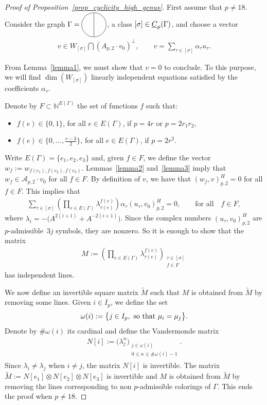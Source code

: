 \documentclass[pdftex]{sigma}
\numberwithin{equation}{section}
\begin{document}
\begin{proof}[Proof of Proposition~\ref{prop_cyclicity_high_genus}]First assume that $p\neq 18$. Consider the graph $\Gamma=\Thetagraph$, a class $[\sigma]\in \underline{C}_p(\Gamma)$, and choose a vector
\begin{gather*}
 v \in W_{[\sigma]}\bigcap \left( A_{p,2}\cdot v_0\right)^{\bot},\qquad v = \sum_{\tau\in [\sigma]}{\alpha_{\tau}u_{\tau}}.
\end{gather*}

From Lemma~\ref{lemma1}, we must show that $v=0$ to conclude. To this purpose, we will find $\dim \left(W_{[\sigma]}\right)$ linearly independent equations satisfied by the coefficients $\alpha_{\tau}$.

Denote by $F\subset \mathbb{N}^{E(\Gamma)}$ the set of functions $f$ such that:
\begin{itemize}\itemsep=0pt
\item $f(e) \in \{0,1\}$, for all $e\in E(\Gamma)$, if $p=4r$ or $p=2r_1r_2$,
\item $f(e) \in \big\{ 0, \ldots, \frac{r-3}{2} \big\}$, for all $e \in E(\Gamma)$, if $p=2r^2$.
\end{itemize}
Write $E(\Gamma)=\{e_1, e_2, e_3\}$ and, given $f\in F$, we define the vector $w_f:= w_{f(e_1), f(e_2), f(e_3)}$. Lemmas~\ref{lemma2} and~\ref{lemma3} imply that $w_f\in \mathcal{A}_{p,2}\cdot v_0$ for all $f\in F$. By definition of $v$, we have that $(w_f, v)_{p,2}^H = 0$ for all $f\in F$. This implies that
\begin{gather*}
 \sum_{\tau\in [\sigma]}{\left( \prod_{e\in E(\Gamma)}{\lambda_{\tau(e)}^{f(e)}}\right) \alpha_{\tau} \left( u_{\tau}, v_0 \right)_{p,2}^H } =0, \qquad \text{for all} \quad f\in F,
\end{gather*}
where $\lambda_i = -\big(A^{2(i+1)}+A^{-2(i+1)}\big)$. Since the complex numbers $( u_{\tau}, v_0)_{p,2}^H$ are $p$-admissible~$3j$ symbols, they are nonzero. So it is enough to show that the matrix
\begin{gather*} M := \left(\prod_{e\in E(\Gamma)}{\lambda_{\tau(e)}^{f(e)}}\right)_{\substack{\tau\in[\sigma] \\ f\in F}} \end{gather*}
has independent lines.

We now define an invertible square matrix $\widetilde{M}$ such that $M$ is obtained from $\widetilde{M}$ by removing some lines. Given $i\in I_p$, we define the set
\begin{gather*} \omega(i) := \big\{ j\in I_p, \mbox{ so that }\mu_{i}=\mu_{j} \big\}.\end{gather*}
Denote by $\# \omega(i)$ its cardinal and define the Vandermonde matrix
\begin{gather*} N[i] := \big( \lambda_j^n \big) _{\substack{ j \in \omega(i)\\ 0\leq n \leq \# \omega(i) -1 }}.\end{gather*}
Since $\lambda_i\neq \lambda_j$ when $i\neq j $, the matrix $N[i]$ is invertible. The matrix $ \widetilde{M} := N[e_1]\otimes N[e_2] \otimes N[e_3]$ is invertible and $M$ is obtained from $\widetilde{M}$ by removing the lines corresponding to non $p$-admissible colorings of $\Gamma$. This ends the proof when $p\neq 18$.


\end{proof}
\end{document}
